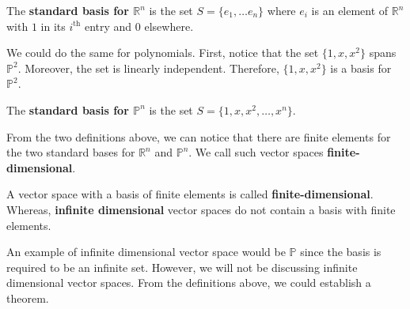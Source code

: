 \documentclass[../../main.tex]{subfiles}
\begin{document}
\begin{definition}{}{}
The \textbf{standard basis for $\mathbb{R}^n$} is the set $S =
\{ e_1, \ldots e_n \}$ where $e_i$ is an element of $\mathbb{R}^n$
with $1$ in its $i^\text{th}$ entry and $0$ elsewhere.
\end{definition}

We could do the same for polynomials. First, notice that the set
$\{ 1, x, x^2 \}$ spans $\mathbb{P}^2$. Moreover, the set is linearly
independent. Therefore, $\{ 1, x, x^2 \}$ is a basis for
$\mathbb{P}^2$.

\begin{definition}{}{}
The \textbf{standard basis for $\mathbb{P}^n$} is the set $S =
\{ 1, x, x^2, \ldots, x^n \}$.
\end{definition}

From the two definitions above, we can notice that there are finite
elements for the two standard bases for $\mathbb{R}^n$ and
$\mathbb{P}^n$. We call such vector spaces
\textbf{finite-dimensional}.

\begin{definition}{}{}
A vector space with a basis of finite elements is called
\textbf{finite-dimensional}. Whereas, \textbf{infinite dimensional}
vector spaces do not contain a basis with finite elements.
\end{definition}

An example of infinite dimensional vector space would be $\mathbb{P}$
since the basis is required to be an infinite set. However, we will
not be discussing infinite dimensional vector spaces. From the
definitions above, we could establish a theorem.
\end{document}
